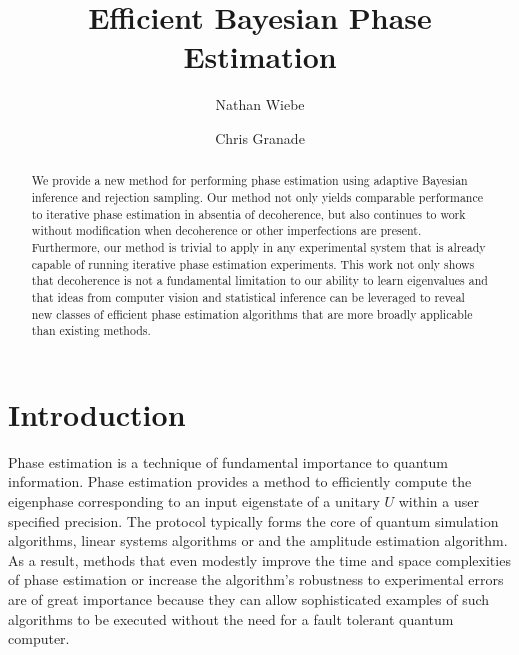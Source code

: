 \documentclass[aps,pra,amsmath,twocolumn,amssymb,superscriptaddress]{revtex4-1}
\begin{document}

\title{Efficient Bayesian Phase Estimation}
\author{Nathan Wiebe}

\author{Chris Granade}

\begin{abstract}
    We provide a new method for performing phase estimation using adaptive
    Bayesian inference and rejection sampling.  Our method not only yields
    comparable performance to iterative phase estimation in absentia of
    decoherence, but also continues to work without modification when
    decoherence or other imperfections are present.  Furthermore, our method
    is trivial to apply in any experimental system that is already capable of
    running iterative phase estimation experiments. This work not only shows that
 decoherence is not a
    fundamental limitation to our ability to learn eigenvalues and that ideas
    from computer vision and statistical inference can be leveraged to reveal
    new classes of efficient phase estimation algorithms that are more broadly
    applicable than existing methods.
\end{abstract}

\maketitle

\section{Introduction}
\label{sec:intro}

Phase estimation is a technique of fundamental importance to quantum information.  Phase estimation provides a method to efficiently compute the eigenphase corresponding to an input eigenstate of a unitary $U$ within a user specified precision.  The protocol typically forms the core of quantum simulation algorithms, linear systems algorithms or and the amplitude estimation algorithm.  As a result, methods that even modestly improve the time and space complexities of phase estimation or increase the algorithm's robustness to experimental errors are of great importance because they can allow sophisticated examples of such algorithms to be executed without the need for a fault tolerant quantum computer.
\end{document}
